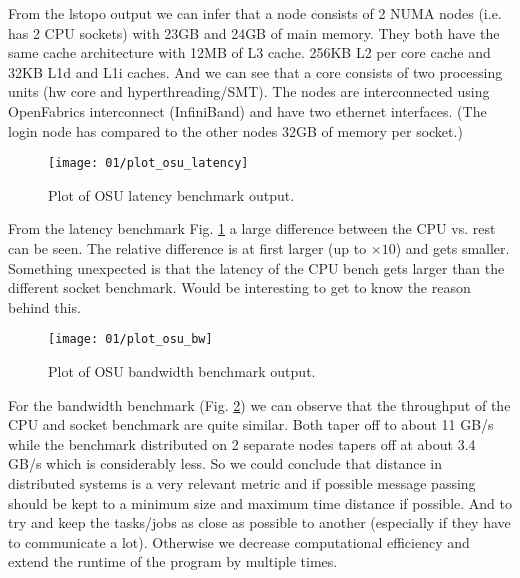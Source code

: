 \documentclass[UTF-8]{article}
\begin{document}
From the lstopo output we can infer that a node consists of 2 NUMA nodes (i.e. has 2 CPU sockets) with 23GB and 24GB of main memory. They both have the same cache architecture with 12MB of L3 cache. 256KB L2 per core cache and 32KB L1d and L1i caches. And we can see that a core consists of two processing units (hw core and hyperthreading/SMT). The nodes are interconnected using OpenFabrics interconnect (InfiniBand) and have two ethernet interfaces. (The login node has compared to the other nodes 32GB of memory per socket.)




\begin{figure}[H]
	\centering
	\texttt{[image: 01/plot\_osu\_latency]}
	\caption{Plot of OSU latency benchmark output.}
	\label{fig:plotosulatency}
\end{figure}

From the latency benchmark Fig. \ref{fig:plotosulatency} a large difference between the CPU vs. rest can be seen. The relative difference is at first larger (up to $\times 10$) and gets smaller. Something unexpected is that the latency of the CPU bench gets larger than the different socket benchmark. Would be interesting to get to know the reason behind this.
    
\begin{figure}[H]
	\centering
	\texttt{[image: 01/plot\_osu\_bw]}
	\caption{Plot of OSU bandwidth benchmark output.}
	\label{fig:plotosubw}
\end{figure}

For the bandwidth benchmark (Fig. \ref{fig:plotosubw}) we can observe that the throughput of the CPU and socket benchmark are quite similar. Both taper off to about 11 GB/s while the benchmark distributed on 2 separate nodes tapers off at about 3.4 GB/s which is considerably less.
So we could conclude that distance in distributed systems is a very relevant metric and if possible message passing should be kept to a minimum size and maximum time distance if possible. And to try and keep the tasks/jobs as close as possible to another (especially if they have to communicate a lot). Otherwise we decrease computational efficiency and extend the runtime of the program by multiple times.
\\
\end{document}
